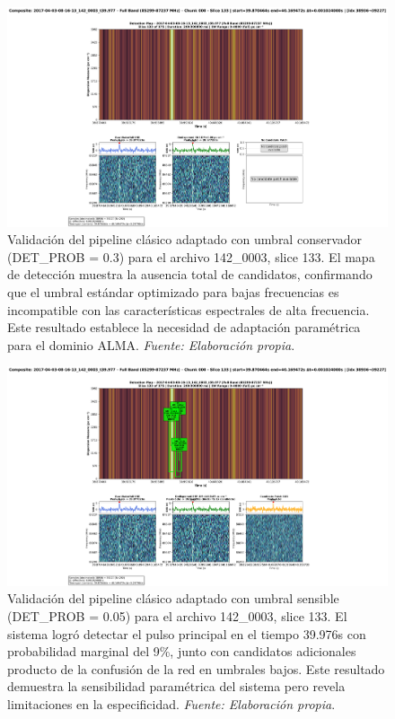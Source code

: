 \begin{figure}[H]
    \centering
    \includegraphics[width=\textwidth]{figures/2017-04-03-08-16-13_142_0003_t39.977_slice133.png}
    \caption[Pipeline clásico: Umbral conservador (142\_0003)]{Validación del pipeline clásico adaptado con umbral conservador (DET\_PROB = 0.3) para el archivo 142\_0003, slice 133. El mapa de detección muestra la ausencia total de candidatos, confirmando que el umbral estándar optimizado para bajas frecuencias es incompatible con las características espectrales de alta frecuencia. Este resultado establece la necesidad de adaptación paramétrica para el dominio ALMA. \textit{Fuente: Elaboración propia}.}
    \label{fig:142_0003_slice133_highProb}
\end{figure}

\begin{figure}[H]
    \centering
    \includegraphics[width=\textwidth]{figures/2017-04-03-08-16-13_142_0003_t39.977_slice133-lowProb.png}
    \caption[Pipeline clásico: Umbral sensible (142\_0003)]{Validación del pipeline clásico adaptado con umbral sensible (DET\_PROB = 0.05) para el archivo 142\_0003, slice 133. El sistema logró detectar el pulso principal en el tiempo 39.976s con probabilidad marginal del 9\%, junto con candidatos adicionales producto de la confusión de la red en umbrales bajos. Este resultado demuestra la sensibilidad paramétrica del sistema pero revela limitaciones en la especificidad. \textit{Fuente: Elaboración propia}.}
    \label{fig:142_0003_slice133_lowProb}
\end{figure}

